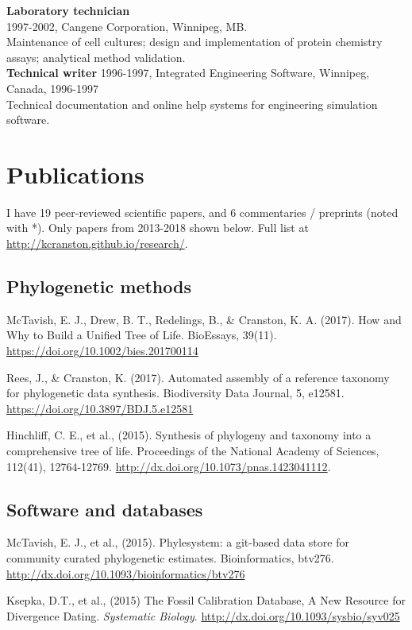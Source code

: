 \documentclass[10pt]{article}
\begin{document}
\noindent \textbf{Laboratory technician} \\
1997-2002, Cangene Corporation, Winnipeg, MB. \\
Maintenance of cell cultures; design and implementation of protein chemistry assays; analytical method validation. \\

\noindent \textbf{Technical writer}
1996-1997, Integrated Engineering Software, Winnipeg, Canada, 1996-1997 \\
Technical documentation and online help systems for engineering simulation software. \\

\section*{Publications}

I have 19 peer-reviewed scientific papers, and 6 commentaries / preprints (noted with *). Only papers from 2013-2018 shown below. Full list at \url{http://kcranston.github.io/research/}.

\subsection*{Phylogenetic methods}
McTavish, E. J., Drew, B. T., Redelings, B., \& Cranston, K. A. (2017). How and Why to Build a Unified Tree of Life. BioEssays, 39(11). \url{https://doi.org/10.1002/bies.201700114}

Rees, J., \& Cranston, K. (2017). Automated assembly of a reference taxonomy for phylogenetic data synthesis. Biodiversity Data Journal, 5, e12581. \url{https://doi.org/10.3897/BDJ.5.e12581}

Hinchliff, C. E., et al., (2015). Synthesis of phylogeny and taxonomy into a comprehensive tree of life. Proceedings of the National Academy of Sciences, 112(41), 12764-12769. \url{http://dx.doi.org/10.1073/pnas.1423041112}. 

\subsection*{Software and databases}
McTavish, E. J., et al., (2015). Phylesystem: a git-based data store for community curated phylogenetic estimates. Bioinformatics, btv276. \url{http://dx.doi.org/10.1093/bioinformatics/btv276} 

Ksepka, D.T., et al., (2015) The Fossil Calibration Database, A New Resource for Divergence Dating. \textit{Systematic Biology}. \url{http://dx.doi.org/10.1093/sysbio/syv025}
\end{document}
